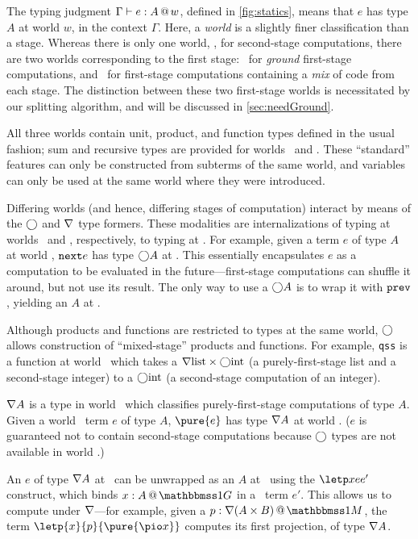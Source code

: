 \begin{abstrsyn}

The typing judgment $\Gamma{} \vdash {e}:{A}~\hspace{-0.15em}\text{@}\hspace{-0.2em}~w$, defined in \ref{fig:statics}, means that
$e$ has type $A$ at world $w$, in the context $\Gamma$. 
Here, a \emph{world} is a slightly finer classification than a stage.
Whereas there is only one world, \bbtwo, for second-stage computations,
there are two worlds corresponding to the first stage:
\bbonep\ for \emph{ground} first-stage computations, and 
\bbonem\ for first-stage computations containing a \emph{mix} of code from each stage. 
The distinction between these two first-stage worlds is necessitated by our splitting algorithm,
and will be discussed in \ref{sec:needGround}.

All three worlds contain unit, product, and function types defined in the usual fashion;
sum and recursive types are provided for worlds \bbonep\ and \bbtwo.
These ``standard'' features can only be constructed from subterms of the same world,
and variables can only be used at the same world where they were introduced.

Differing worlds (and hence, differing stages of computation) interact by means
of the $\bigcirc$ and $\nabla$ type formers.  These modalities are internalizations
of typing at worlds \bbtwo\ and \bbonep, respectively, to typing at \bbonep.
For example, given a term $e$ of type $A$ at world \bbtwo, 
${\tt next}{e}$ has type $\bigcirc A$ at \bbonem. This essentially
encapsulates $e$ as a computation to be evaluated in the future---first-stage
computations can shuffle it around, but not use its result.  The only way to use
a $\bigcirc A$ is to wrap it with ${\tt prev}$, yielding an $A$ at \bbtwo.

Although products and functions are restricted to types at the same world,
$\bigcirc$ allows construction of ``mixed-stage'' products and functions.
For example, \texttt{qss} is a function at world \bbonem\ which takes a
$\nabla{\rm list} \times \bigcirc{\rm int}$ (a purely-first-stage list and a
second-stage integer) to a $\bigcirc{\rm int}$ (a second-stage
computation of an integer).

$\nabla A$ is a type in world \bbonem\ which classifies purely-first-stage
computations of type $A$. Given a world \bbonep\ term $e$ of type $A$,
$\pure{e}$ has type $\nabla A$ at world \bbonem. ($e$ is guaranteed not to contain
second-stage computations because $\bigcirc$ types are not available in world
\bbonep.)

An $e$ of type $\nabla A$ at \bbonem\ can be unwrapped as an $A$ at \bbonep\
using the $\letp xe{e'}$ construct, which binds $\colpure xA$ in a \bbonem\ term
$e'$. This allows us to compute under $\nabla$---for example, given a $\colmix
p{\curr(A\times B)}$, the term $\letp{x}{p}{\pure{\pio x}}$ computes its first
projection, of type $\nabla A$.


\end{abstrsyn}
